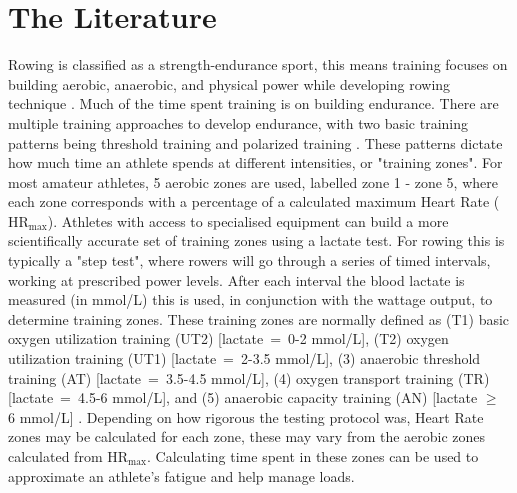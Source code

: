 \documentclass[a4paper]{article}
\begin{document}
\section{The Literature}
Rowing is classified as a strength-endurance sport, this means training focuses on building aerobic, anaerobic, and physical power while developing rowing technique \autocite{Mäestu2005}. Much of the time spent training is on building endurance. There are multiple training approaches to develop endurance, with two basic training patterns being threshold training and polarized training \autocite{Seiler2006}. These patterns dictate how much time an athlete spends at different intensities, or "training zones". For most amateur athletes, 5 aerobic zones are used, labelled zone 1 - zone 5, where each zone corresponds with a percentage of a calculated maximum Heart Rate ($\textrm{HR}_{\text{max}}$). 
Athletes with access to specialised equipment can build a more scientifically accurate set of training zones using a lactate test. For rowing this is typically a "step test", where rowers will go through a series of timed intervals, working at prescribed power levels. After each interval the blood lactate is measured (in mmol/L) this is used, in conjunction with the wattage output, to determine training zones. These training zones are normally defined as (T1) basic oxygen utilization training (UT2) [lactate~=~0-2 mmol/L], (T2) oxygen utilization training (UT1) [lactate~=~2-3.5 mmol/L], (3) anaerobic threshold training (AT) [lactate~=~3.5-4.5 mmol/L], (4) oxygen transport training (TR) [lactate~=~4.5-6 mmol/L], and (5) anaerobic capacity training (AN) [lactate $\geq$ 6 mmol/L] \autocite{Das2022}. Depending on how rigorous the testing protocol was, Heart Rate zones may be calculated for each zone, these may vary from the aerobic zones calculated from $\textrm{HR}_{\text{max}}$. 
Calculating time spent in these zones can be used to approximate an athlete's fatigue and help manage loads.
\end{document}
